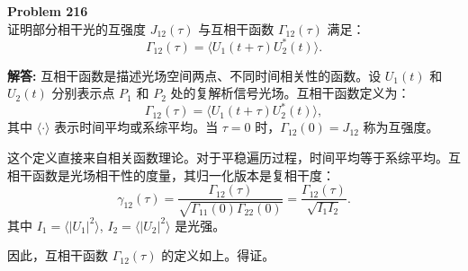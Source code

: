 \documentclass[12pt, a4paper, oneside]{ctexart}
\newenvironment{solution}{\par\noindent\textbf{解答:}\quad}{\par}
\begin{document}
\begin{mdframed}[backgroundcolor=gray!10, linewidth=0pt]
    \textbf{Problem 216} \\
    证明部分相干光的互强度 $J_{12}(\tau)$ 与互相干函数 $\Gamma_{12}(\tau)$ 满足：
    \[
    \Gamma_{12}(\tau) = \langle U_1(t+\tau) U_2^*(t) \rangle.
    \]
\end{mdframed}
\begin{solution}
    互相干函数是描述光场空间两点、不同时间相关性的函数。设 $U_1(t)$ 和 $U_2(t)$ 分别表示点 $P_1$ 和 $P_2$ 处的复解析信号光场。互相干函数定义为：
    \[
    \Gamma_{12}(\tau) = \langle U_1(t+\tau) U_2^*(t) \rangle,
    \]
    其中 $\langle \cdot \rangle$ 表示时间平均或系综平均。当 $\tau=0$ 时，$\Gamma_{12}(0) = J_{12}$ 称为互强度。

    这个定义直接来自相关函数理论。对于平稳遍历过程，时间平均等于系综平均。互相干函数是光场相干性的度量，其归一化版本是复相干度：
    \[
    \gamma_{12}(\tau) = \frac{\Gamma_{12}(\tau)}{\sqrt{\Gamma_{11}(0) \Gamma_{22}(0)}} = \frac{\Gamma_{12}(\tau)}{\sqrt{I_1 I_2}}.
    \]
    其中 $I_1 = \langle |U_1|^2 \rangle$, $I_2 = \langle |U_2|^2 \rangle$ 是光强。

    因此，互相干函数 $\Gamma_{12}(\tau)$ 的定义如上。得证。
\end{solution}
\end{document}
